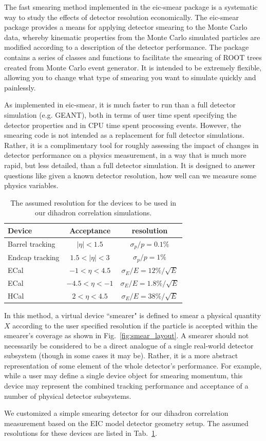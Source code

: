 The fast smearing method implemented in the eic-smear package is a systematic
way to study the effects of detector resolution economically. The eic-smear
package provides a means for applying detector smearing to the Monte Carlo
data, whereby kinematic properties from the Monte Carlo simulated particles are modified according
to a description of the detector performance. The package contains a series of
classes and functions to facilitate the smearing of ROOT trees created from
Monte Carlo event generator. It is intended to be extremely flexible,
allowing you to change what type of smearing you want to simulate quickly and
painlessly.

As implemented in eic-smear, it is much faster to run than a full detector
simulation (e.g. GEANT), both in terms of user time spent specifying the
detector properties and in CPU time spent processing events. However,  the
smearing code is not intended as a replacement for full detector simulations.
Rather, it is a complimentary tool for roughly assessing the impact of changes
in detector performance on a physics measurement, in a way that is much more
rapid, but less detailed, than a full detector simulation. It is designed to
answer questions like given a known detector resolution, how well can we
measure some physics variables. 

\begin{table} 
\centering 
\begin{tabular}{| l | c | c | } \hline
Device	& Acceptance & resolution \\ \hline
Barrel tracking  	&  $|\eta|<1.5$  &  $\sigma_{p}/p=0.1\%$   \\  
Endcap tracking    &  $1.5<|\eta|<3$  &   $\sigma_{p}/p=1\%$   \\  
ECal   & $-1<\eta<4.5$  &  $\sigma_{E}/E=12\%/\sqrt{E}$   \\  
ECal  & $-4.5<\eta<-1$ & $\sigma_{E}/E=1.8\%/\sqrt{E}$   \\ 
HCal  & $2<\eta<4.5$ & $\sigma_{E}/E=38\%/\sqrt{E}$   \\ \hline
\end{tabular} 
\caption[The
assumed resolution for the devices to be used in our dihadron correlation simulations]{The
assumed resolution for the devices to be used in our dihadron correlation simulations.}
\label{tab:EIC_smear} 
\end{table}


In this method, a virtual device ``smearer" is defined to smear a physical
quantity $X$ according to the user specified resolution if the particle is accepted
within the smearer's coverage as shown in Fig.~\ref{fig:smear_layout}. A smearer should not necessarily be considered to
be a direct analogue of a single real-world detector subsystem (though in some
cases it may be). Rather, it is a more abstract representation of some element
of the whole detector's performance. For example, while a user may define a
single device object for smearing momentum, this device may represent the
combined tracking performance and acceptance of a number of physical detector
subsystems.

We customized a simple smearing detector for our dihadron correlation
measurement based on the EIC model detector geometry setup. The assumed
resolutions for these devices are listed in Tab.~\ref{tab:EIC_smear}.




